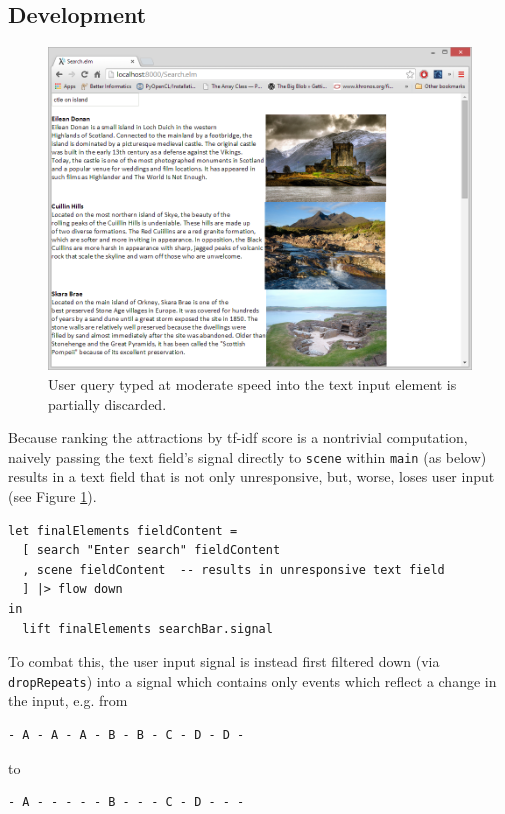 \documentclass[12pt]{article}
\begin{document}
\subsection{Development}
\begin{figure}[ht!]

\centering
\includegraphics[width=150mm]{lost_input.png}
\caption{User query typed at moderate speed into the text input element is partially discarded.}
\label{fig:Lost}
\end{figure}
Because ranking the attractions by tf-idf score is a nontrivial computation, naively passing the text field's signal directly to \texttt{scene} within \texttt{main} (as below) results in a text field that is not only unresponsive, but, worse, loses user input (see Figure \ref{fig:Lost}).
\begin{samepage}
\begin{verbatim}
let finalElements fieldContent = 
  [ search "Enter search" fieldContent
  , scene fieldContent  -- results in unresponsive text field
  ] |> flow down
in
  lift finalElements searchBar.signal
\end{verbatim}
\end{samepage}
To combat this, the user input signal is instead first filtered down (via \texttt{dropRepeats}) into a signal which contains only events which reflect a change in the input, e.g. from
\begin{samepage}
\begin{verbatim}
- A - A - A - B - B - C - D - D -
\end{verbatim}
to
\begin{verbatim}
- A - - - - - B - - - C - D - - -
\end{verbatim}
\end{samepage}
\end{document}
